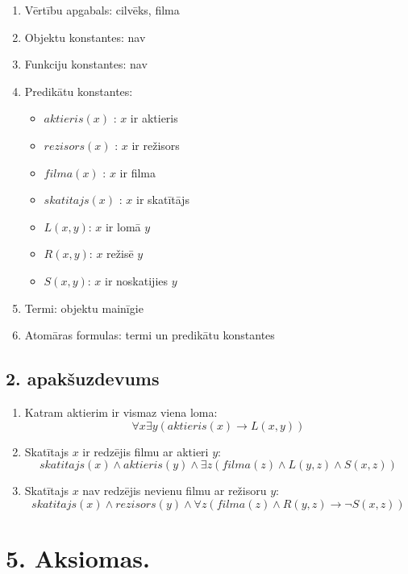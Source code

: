 \documentclass{article}
\begin{document}
\begin{enumerate}
    \item Vērtību apgabals: cilvēks, filma
    \item Objektu konstantes: nav
    \item Funkciju konstantes: nav
    \item Predikātu konstantes:
          \begin{itemize}
              \item $ aktieris(x) $ : $ x $ ir aktieris
              \item $ rezisors(x) $ : $ x $ ir režisors
              \item $ filma(x) $ : $ x $ ir filma
              \item $ skatitajs(x) $ : $ x $ ir skatītājs
              \item $ L(x,y) $: $ x $ ir lomā $ y $
              \item $ R(x,y) $: $ x $ režisē $ y $
              \item $ S(x,y) $: $ x $ ir noskatijies $ y $
          \end{itemize}
    \item Termi: objektu mainīgie
    \item Atomāras formulas: termi un predikātu konstantes
\end{enumerate}

\subsection*{2. apakšuzdevums}

\begin{enumerate}
    \item Katram aktierim ir vismaz viena loma:
          \[
              \forall x \exists y (aktieris(x) \rightarrow L(x, y))
          \]

    \item Skatītajs $x$ ir redzējis filmu ar aktieri $y$:
          \[
              skatitajs(x) \land aktieris(y) \land \exists z(filma(z) \land L(y, z) \land S(x, z))
          \]

    \item Skatītajs $x$ nav redzējis nevienu filmu ar režisoru $y$:
          \[
            skatitajs(x) \land rezisors(y) \land \forall z (filma(z) \land R(y, z) \rightarrow \neg S(x, z))
          \]
\end{enumerate}


\pagebreak
\section*{5. Aksiomas.}
\end{document}
